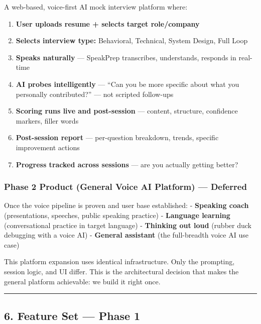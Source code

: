 \documentclass[
  11pt,
]{article}
\providecommand{\tightlist}{%
  \setlength{\itemsep}{0pt}\setlength{\parskip}{0pt}}
\begin{document}
A web-based, voice-first AI mock interview platform where:

\begin{enumerate}
\def\labelenumi{\arabic{enumi}.}
\tightlist
\item
  \textbf{User uploads resume + selects target role/company}
\item
  \textbf{Selects interview type:} Behavioral, Technical, System Design,
  Full Loop
\item
  \textbf{Speaks naturally} --- SpeakPrep transcribes, understands,
  responds in real-time
\item
  \textbf{AI probes intelligently} --- ``Can you be more specific about
  what you personally contributed?'' --- not scripted follow-ups
\item
  \textbf{Scoring runs live and post-session} --- content, structure,
  confidence markers, filler words
\item
  \textbf{Post-session report} --- per-question breakdown, trends,
  specific improvement actions
\item
  \textbf{Progress tracked across sessions} --- are you actually getting
  better?
\end{enumerate}

\hypertarget{phase-2-product-general-voice-ai-platform-deferred}{%
\subsubsection{Phase 2 Product (General Voice AI Platform) ---
Deferred}\label{phase-2-product-general-voice-ai-platform-deferred}}

Once the voice pipeline is proven and user base established: -
\textbf{Speaking coach} (presentations, speeches, public speaking
practice) - \textbf{Language learning} (conversational practice in
target language) - \textbf{Thinking out loud} (rubber duck debugging
with a voice AI) - \textbf{General assistant} (the full-breadth voice AI
use case)

This platform expansion uses identical infrastructure. Only the
prompting, session logic, and UI differ. This is the architectural
decision that makes the general platform achievable: we build it right
once.

\begin{center}\rule{0.5\linewidth}{0.5pt}\end{center}

\hypertarget{feature-set-phase-1}{%
\subsection{6. Feature Set --- Phase 1}\label{feature-set-phase-1}}
\end{document}
